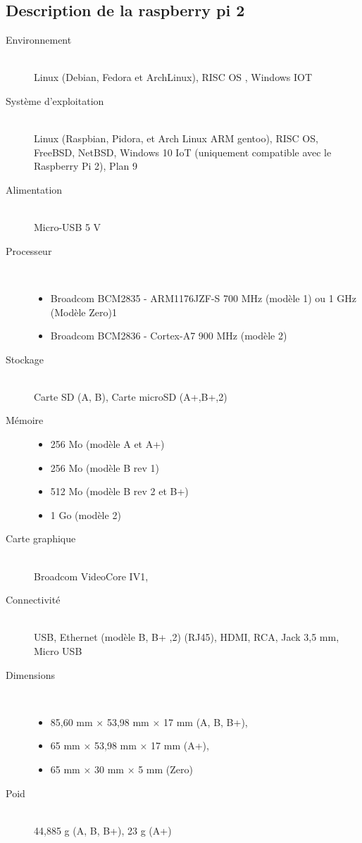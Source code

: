 \subsection{Description de la raspberry pi 2}
\begin{description}
	\item[Environnement] \hfill \\ Linux (Debian, Fedora et ArchLinux), RISC OS , Windows IOT
	\item[Système d'exploitation] \hfill \\ Linux (Raspbian, Pidora, et Arch Linux ARM gentoo), RISC OS, FreeBSD, NetBSD, Windows 10 IoT (uniquement compatible avec le Raspberry Pi 2), Plan 9
	\item[Alimentation] \hfill \\ Micro-USB 5 V
	\item[Processeur] \hfill \\
		\begin{itemize}
			\item Broadcom BCM2835 - ARM1176JZF-S 700 MHz (modèle 1) ou 1 GHz (Modèle Zero)1
			\item Broadcom BCM2836 - Cortex-A7 900 MHz (modèle 2)
		\end{itemize}

	\item[Stockage] \hfill \\ Carte SD (A, B), Carte microSD (A+,B+,2)
	\item[Mémoire] 
		\begin{itemize}
			\item 256 Mo (modèle A et A+)
			\item 256 Mo (modèle B rev 1)
			\item 512 Mo (modèle B rev 2 et B+)
			\item 1 Go (modèle 2)
		\end{itemize}

	\item[Carte graphique] \hfill \\ Broadcom VideoCore IV1,
	\item[Connectivité] \hfill \\ USB, Ethernet (modèle B, B+ ,2) (RJ45), HDMI, RCA, Jack 3,5 mm, Micro USB
	\item[Dimensions] \hfill \\ 
		\begin{itemize}
			\item 85,60 mm × 53,98 mm × 17 mm (A, B, B+),
			\item 65 mm × 53,98 mm × 17 mm (A+),
			\item 65 mm × 30 mm × 5 mm (Zero)
		\end{itemize}
	\item[Poid] \hfill \\ 44,885 g (A, B, B+), 23 g (A+)
\end{description}

